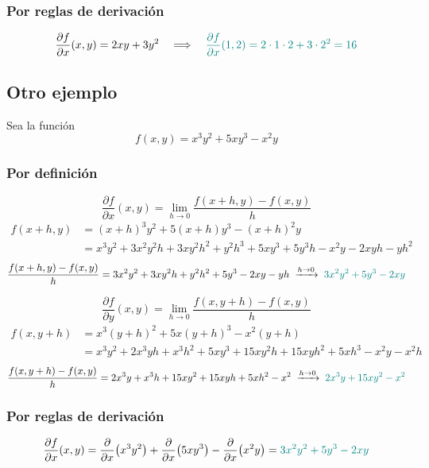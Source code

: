 \documentclass{article}
\begin{document}
\subsubsection*{Por reglas de derivación}
\[
\frac{\partial f}{\partial x}(x,y)
=2xy + 3y^{2}
\quad\Longrightarrow\quad \color{teal}
\frac{\partial f}{\partial x}(1,2)
=2\cdot1\cdot2 + 3\cdot2^{2}
=16
\]





\subsection*{Otro ejemplo}

Sea la función
\[
f(x,y)=x^{3}y^{2} + 5xy^{3} - x^{2}y
\]



\subsubsection*{Por definición}

\[
\frac{\partial f}{\partial x}(x,y)
=
\lim_{h\to0}
\frac{f(x+h,y)-f(x,y)}{h}
\]
\begin{align*}
f(x+h,y)
&=(x+h)^{3}y^{2} + 5(x+h)y^{3} - (x+h)^{2}y\\
&=x^{3}y^{2} + 3x^{2}y^{2}h + 3xy^{2}h^{2} + y^{2}h^{3}
+5xy^{3} +5y^{3}h
- x^{2}y -2xyh - yh^{2}
\end{align*}
\[
\frac{f(x+h,y)-f(x,y)}{h}
=3x^{2}y^{2} +3xy^{2}h +y^{2}h^{2} +5y^{3} -2xy - yh
\;\xrightarrow{h\to0}\;
\color{teal}
3x^{2}y^{2} +5y^{3} -2xy
\]

\[
\frac{\partial f}{\partial y}(x,y)
=
\lim_{h\to0}
\frac{f(x,y+h)-f(x,y)}{h}
\]
\begin{align*}
f(x,y+h)
&=x^{3}(y+h)^{2} +5x(y+h)^{3} - x^{2}(y+h)\\
&=x^{3}y^{2} +2x^{3}yh +x^{3}h^{2}
+5xy^{3} +15xy^{2}h +15xyh^{2} +5xh^{3}
- x^{2}y - x^{2}h
\end{align*}
\[
\frac{f(x,y+h)-f(x,y)}{h}
=2x^{3}y +x^{3}h +15xy^{2} +15xyh +5xh^{2} -x^{2}
\;\xrightarrow{h\to0}\;
\color{teal}
2x^{3}y +15xy^{2} - x^{2}
\]



\subsubsection*{Por reglas de derivación}
\[
\frac{\partial f}{\partial x}(x,y)
=\frac{\partial}{\partial x}\bigl(x^{3}y^{2}\bigr)
+\frac{\partial}{\partial x}\bigl(5xy^{3}\bigr)
-\frac{\partial}{\partial x}\bigl(x^{2}y\bigr)
=\color{teal}3x^{2}y^{2} + 5y^{3} - 2xy
\]
\end{document}
